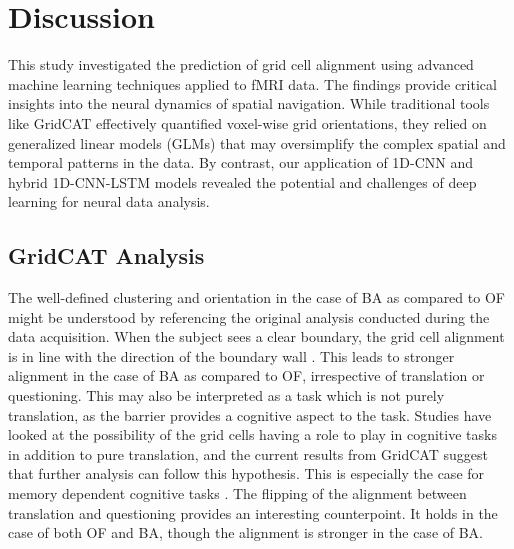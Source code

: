 \documentclass[a4paper]{article}
\begin{document}
\section{Discussion}
\label{sec:discussion}    
\noindent This study investigated the prediction of grid cell alignment using advanced machine learning techniques applied to fMRI data. The findings provide critical insights into the neural dynamics of spatial navigation. While traditional tools like GridCAT effectively quantified voxel-wise grid orientations, they relied on generalized linear models (GLMs) that may oversimplify the complex spatial and temporal patterns in the data. By contrast, our application of 1D-CNN and hybrid 1D-CNN-LSTM models revealed the potential and challenges of deep learning for neural data analysis. \\

\subsection{\textbf{GridCAT Analysis}}

The well-defined clustering and orientation in the case of BA as compared to OF might be understood by referencing the original analysis conducted during the data acquisition. When the subject sees a clear boundary, the grid cell alignment is in line with the direction of the boundary wall \cite{he_environmental_2019}. This leads to stronger alignment in the case of BA as compared to OF, irrespective of translation or questioning. This may also be interpreted as a task which is not purely translation, as the barrier provides a cognitive aspect to the task. Studies have looked at the possibility of the grid cells having a role to play in cognitive tasks in addition to pure translation, and the current results from GridCAT suggest that further analysis can follow this hypothesis. This is especially the case for memory dependent cognitive tasks \cite{doeller_evidence_2010}. The flipping of the alignment between translation and questioning provides an interesting counterpoint. It holds in the case of both OF and BA, though the alignment is stronger in the case of BA. 
\end{document}
